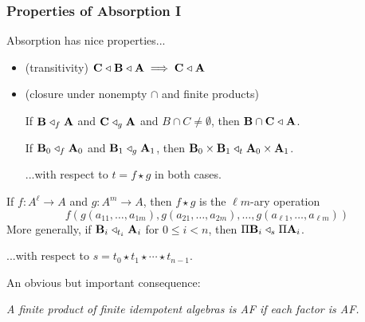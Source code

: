 \documentclass[9pt,xcolor=dvipsnames%
   ]{beamer}
\begin{document}
\begin{frame} \frametitle{Properties of Absorption I}
Absorption has nice properties...
  \begin{itemize}
  \item (transitivity) $\mathbf{C} \mathrel{\triangleleft} \mathbf{B} \mathrel{\triangleleft} \mathbf{A} \; \Longrightarrow \; \mathbf{C} \mathrel{\triangleleft} \mathbf{A}$
  \item (closure under nonempty $\cap$ and finite products)
    
    \medskip
    If $\mathbf{B} \mathrel{\triangleleft}_f \mathbf{A}$ and $\mathbf{C} \mathrel{\triangleleft}_g \mathbf{A}$ and $B \cap C\neq \emptyset$, then 
    $\mathbf{B} \cap \mathbf{C}\mathrel{\triangleleft} \mathbf{A}$.

    \medskip

    If $\mathbf{B}_0 \mathrel{\triangleleft}_f \mathbf{A}_0$ and $\mathbf{B}_1 \mathrel{\triangleleft}_g \mathbf{A}_1$,
    then $\mathbf{B}_0\times \mathbf{B}_1 \mathrel{\triangleleft}_t \mathbf{A}_0\times \mathbf{A}_1$. 

    \smallskip
    {\small ...with respect to $t = f\star g$ in both cases.}

    \medskip
    
  \end{itemize}

  \begin{overprint}
    
        If $f: A^\ell\to A$ and $g: A^m\to A$, then
        $f \star g$  is the $\ell m$-ary operation 
        \[f(g(a_{1 1}, \dots, a_{1 m}), g(a_{2 1}, \dots, a_{2 m}), \dots,  g(a_{\ell 1}, \dots, a_{\ell m}))\]
    More generally, 
    if $\mathbf{B}_i\mathrel{\triangleleft}_{t_i}\mathbf{A}_i$ for $0\leq i < n$, then
    $\Pi \mathbf{B}_i \mathrel{\triangleleft}_s \Pi \mathbf{A}_i$.
    

    \smallskip
    {\small ...with respect to $s= t_0\star t_1 \star \cdots \star t_{n-1}$.}

    \bigskip
    An obvious but important consequence:
    \begin{center}
    {\it A finite product of finite idempotent algebras is AF if each factor is AF.}
    \end{center}
  \end{overprint}
\end{frame}
\end{document}
